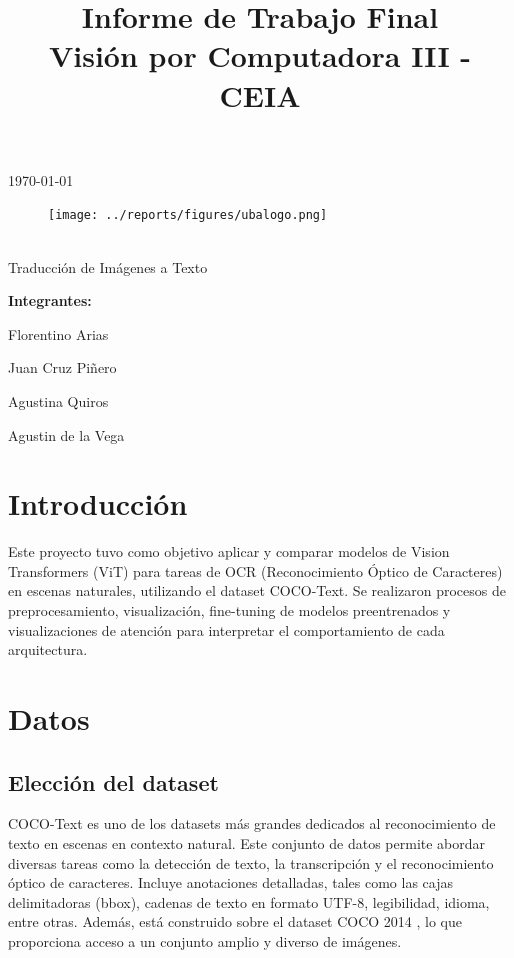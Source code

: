 \documentclass[12pt]{article}
\title{\Huge Informe de Trabajo Final\\Visión por Computadora III - CEIA}
\newcommand{\subtitle}{\Large Traducción de Imágenes a Texto}
\begin{document}
\begin{center}
    {\small \today}  %
\end{center}

\begin{figure}[t]
    \centering
    \texttt{[image: ../reports/figures/ubalogo.png]}
\end{figure}

\begin{center}
    {\LARGE \textbf{\thetitle}}\\[1em]
    {\large \subtitle}
\end{center}

\vspace{2cm}

\begin{flushright}
{\Large
\textbf{Integrantes:}\par
 Florentino Arias\par
 Juan Cruz Piñero\par
 Agustina Quiros\par
 Agustin de la Vega
}
\end{flushright}

\newpage

\section{Introducción}
Este proyecto tuvo como objetivo aplicar y comparar modelos de Vision Transformers (ViT) para tareas
de OCR (Reconocimiento Óptico de Caracteres) en escenas naturales, utilizando el dataset COCO-Text.
Se realizaron procesos de preprocesamiento, visualización, fine-tuning de modelos preentrenados y visualizaciones
de atención para interpretar el comportamiento de cada arquitectura.


\section{Datos}
\subsection{Elección del dataset}
COCO-Text \cite{cocotext} es uno de los datasets más grandes dedicados al reconocimiento de texto en escenas en contexto natural.
Este conjunto de datos permite abordar diversas tareas como la detección de texto, la transcripción y el 
reconocimiento óptico de caracteres. Incluye anotaciones detalladas, tales como las cajas delimitadoras 
(bbox), cadenas de texto en formato UTF-8, legibilidad, idioma, entre otras. Además, está construido 
sobre el dataset COCO 2014 \cite{coco2014}, lo que proporciona acceso a un conjunto amplio y diverso de imágenes.
\end{document}
